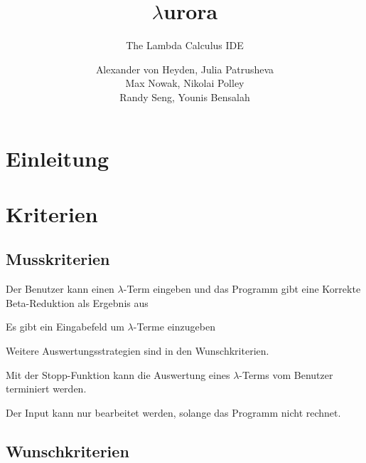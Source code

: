 \documentclass[parskip=full,11pt,twoside]{scrartcl}
\title{$\lambda$urora}
\subtitle{The Lambda Calculus IDE}
\author{Alexander von Heyden, Julia Patrusheva\\
 Max Nowak, Nikolai Polley\\
 Randy Seng, Younis Bensalah}
\begin{document}
\maketitle
\newpage
\tableofcontents

\newpage
\section{Einleitung}


\pagebreak
\section{Kriterien}

\subsection{Musskriterien}


Der Benutzer kann einen $\lambda$-Term eingeben und das Programm gibt eine Korrekte Beta-Reduktion als Ergebnis aus 

Es gibt ein Eingabefeld um $\lambda$-Terme einzugeben

 Weitere Auswertungsstrategien sind in den Wunschkriterien.


Mit der Stopp-Funktion kann die Auswertung eines $\lambda$-Terms vom Benutzer terminiert werden.


Der Input kann nur bearbeitet werden, solange das Programm nicht rechnet.


\subsection{Wunschkriterien}

\end{document}
